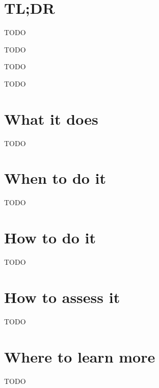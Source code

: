 \documentclass[
]{book}
\providecommand{\tightlist}{%
  \setlength{\itemsep}{0pt}\setlength{\parskip}{0pt}}
\begin{document}
\hypertarget{tldr-22}{%
\section{TL;DR}\label{tldr-22}}

\begin{description}
\tightlist
\item[What it does]
TODO
\item[When to do it]
TODO
\item[How to do it]
TODO
\item[How to assess it]
TODO
\end{description}

\hypertarget{what-it-does-22}{%
\section{What it does}\label{what-it-does-22}}

TODO

\hypertarget{when-to-do-it-22}{%
\section{When to do it}\label{when-to-do-it-22}}

TODO

\hypertarget{how-to-do-it-22}{%
\section{How to do it}\label{how-to-do-it-22}}

TODO

\hypertarget{how-to-assess-it-22}{%
\section{How to assess it}\label{how-to-assess-it-22}}

TODO

\hypertarget{where-to-learn-more-22}{%
\section{Where to learn more}\label{where-to-learn-more-22}}

TODO

  
\end{document}
